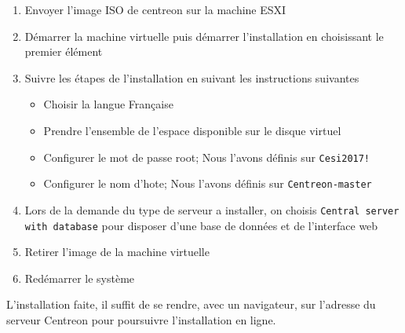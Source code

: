 	\begin{enumerate}
		\item Envoyer l'image ISO de centreon sur la machine ESXI
		\item Démarrer la machine virtuelle puis démarrer l'installation en choisissant le premier élément
		\item Suivre les étapes de l'installation en suivant les instructions suivantes
			\begin{itemize}
				\item Choisir la langue Française
				\item Prendre l'ensemble de l'espace disponible sur le disque virtuel
				\item Configurer le mot de passe root; Nous l'avons définis sur \texttt{Cesi2017!}
				\item Configurer le nom d'hote; Nous l'avons définis sur \texttt{Centreon-master}
			\end{itemize}
		\item Lors de la demande du type de serveur a installer, on choisis \texttt{Central server with database} pour disposer d'une base de données et de l'interface web
		\item Retirer l'image de la machine virtuelle
		\item Redémarrer le système
	\end{enumerate}

	L'installation faite, il suffit de se rendre, avec un navigateur, sur l'adresse du serveur Centreon pour poursuivre l'installation en ligne.


